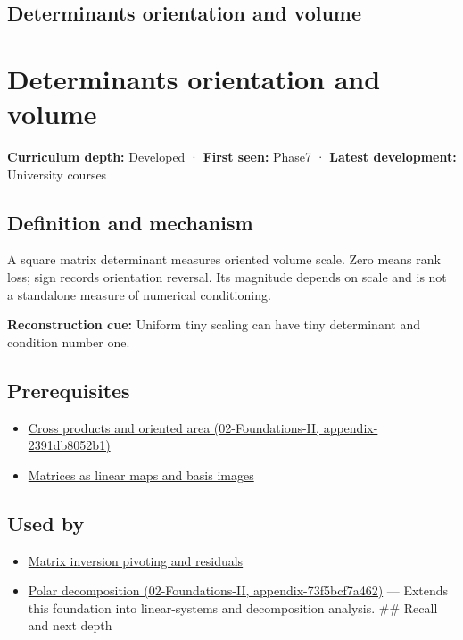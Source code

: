 \hypertarget{appendix-da478be01d02}{}
\section*{Determinants orientation and volume}
\chapter{Determinants orientation and volume}\label{appendix-da478be01d02-determinants-orientation-and-volume}

\textbf{Curriculum depth:} Developed · \textbf{First seen:} Phase7 · \textbf{Latest development:} University courses

\section{Definition and mechanism}\label{appendix-da478be01d02-definition-and-mechanism}

A square matrix determinant measures oriented volume scale. Zero means rank loss; sign records orientation reversal. Its magnitude depends on scale and is not a standalone measure of numerical conditioning.

\textbf{Reconstruction cue:} Uniform tiny scaling can have tiny determinant and condition number one.

\section{Prerequisites}\label{appendix-da478be01d02-prerequisites}

\begin{itemize}
\tightlist
\item
  \href{../02-Foundations-II/main.pdf\#nameddest=appendix-2391db8052b1}{Cross products and oriented area (02-Foundations-II, appendix-2391db8052b1)}
\item
  \hyperref[appendix-bd39c3bf5d64]{Matrices as linear maps and basis images}
\end{itemize}

\section{Used by}\label{appendix-da478be01d02-used-by}

\begin{itemize}
\tightlist
\item
  \hyperref[appendix-48d2e66378ab]{Matrix inversion pivoting and residuals}
\item
  \href{../02-Foundations-II/main.pdf\#nameddest=appendix-73f5bcf7a462}{Polar decomposition (02-Foundations-II, appendix-73f5bcf7a462)} --- Extends this foundation into linear-systems and decomposition analysis. \#\# Recall and next depth
\end{itemize}

